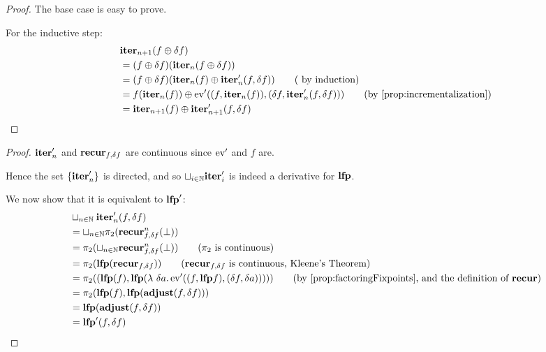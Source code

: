 \iterDerivativesF*
\begin{proof}
  \label{prf:iterDerivativesF}
  The base case is easy to prove.

  For the inductive step:
  \begin{align*}
    &\iter_{n+1}(f \cplus \change{f})\\
    &=(f \cplus \change{f})(\iter_{n}(f \cplus \change{f}))\\
    &= (f \cplus \change{f})(
        \iter_{n}(f)
        \cplus \derive{\iter_{n}}(f, \change{f})
      )
    \tag{ by induction}\\
    &= f(\iter_n(f)) \cplus \derive{\ev}((f, \iter_{n}(f)), (\change{f},
      \derive{\iter_{n}}(f, \change{f})))
    \tag{by \cref{prop:incrementalization}}\\
    & =\iter_{n+1}(f) \cplus \derive{\iter_{n+1}}(f, \change{f})
  \end{align*}
\end{proof}

\leastFixpointDerivatives*
\begin{proof}
  \label{prf:leastFixpointDerivatives}
  $\mathbf{iter}_n'$ and $\mathbf{recur}_{f, \delta f}$ are continuous since
  $\operatorname{ev}'$ and $f$ are.

  Hence the set $\{ \mathbf{iter}'_n \}$ is directed, and so $\sqcup_{i \in \mathbb{N}}
  \mathbf{iter}_i'$ is indeed a derivative for $\mathbf{lfp}$.

  We now show that it is equivalent to $\mathbf{lfp}'$:
  \begin{align*}
    &\sqcup_{n \in \NN} \derive{\iter_n}(f, \change{f})\\
    &=\sqcup_{n \in \NN} \pi_2(\nextiter_{f, \change{f}}^n(\bot))\\
    &=\pi_2(\sqcup_{n \in \NN} \nextiter_{f, \change{f}}^n(\bot)) \tag{$\pi_2$ is continuous}\\
    &= \pi_2 (\lfp(\nextiter_{f, \change{f}})) \tag{$\nextiter_{f, \change{f}}$ is continuous, Kleene's Theorem}\\
    &= \pi_2 ((\lfp(f), \lfp (\lambda\ \change{a}. \derive{\ev}((f, \lfp f), (\change{f}, \change{a})))))
    \tag{by \cref{prop:factoringFixpoints}, and the definition of $\nextiter$}\\
    &= \pi_2 (\lfp(f), \lfp(\adjust(f, \change{f})))\\
    &= \lfp(\adjust(f, \change{f}))\\
    &= \derive{\lfp}(f, \change{f})
  \end{align*}
\end{proof}


